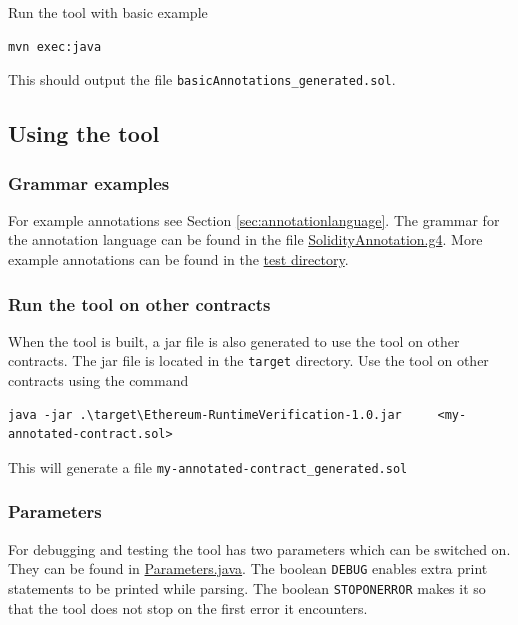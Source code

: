 \documentclass[a4paper]{article}
\begin{document}
Run the tool with basic example

\begin{verbatim}
mvn exec:java
\end{verbatim}

This should output the file \texttt{basicAnnotations\_generated.sol}.

\hypertarget{using-the-tool}{%
\subsection{Using the tool}\label{using-the-tool}}

\hypertarget{grammar-examples}{%
\subsubsection{Grammar examples}\label{grammar-examples}}

For example annotations see Section \ref{sec:annotationlanguage}. The grammar for the annotation
language can be found in the file
\href{https://github.com/LarsStegeman/EthereumRuntimeMonitoring/blob/master/src/main/antlr4/SolidityAnnotated.g4}{SolidityAnnotation.g4}. More
example annotations can be found in the \href{https://github.com/LarsStegeman/EthereumRuntimeMonitoring/tree/master/src/test/contracts}{test
directory}.

\hypertarget{run-the-tool-on-other-contracts}{%
\subsubsection{Run the tool on other
contracts}\label{run-the-tool-on-other-contracts}}

When the tool is built, a jar file is also generated to use the tool on
other contracts. The jar file is located in the \texttt{target}
directory. Use the tool on other contracts using the command

\begin{verbatim}
java -jar .\target\Ethereum-RuntimeVerification-1.0.jar     <my-annotated-contract.sol>
\end{verbatim}

This will generate a file \texttt{my-annotated-contract\_generated.sol}

\hypertarget{parameters}{%
\subsubsection{Parameters}\label{parameters}}

For debugging and testing the tool has two parameters which can be
switched on. They can be found in
\href{https://github.com/LarsStegeman/EthereumRuntimeMonitoring/blob/master/src/main/java/utils/Parameters.java}{Parameters.java}. The boolean
\texttt{DEBUG} enables extra print statements to be printed while
parsing. The boolean \texttt{STOPONERROR} makes it so that the tool does
not stop on the first error it encounters.

\newpage


\end{document}
